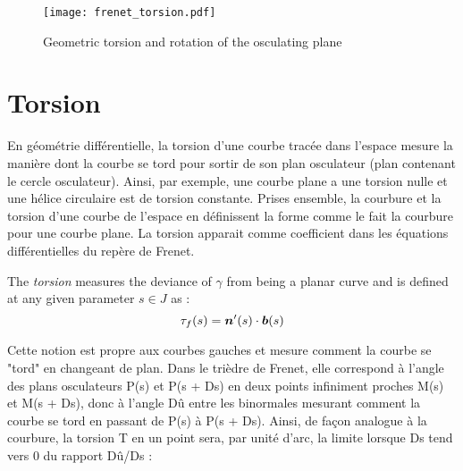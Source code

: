 
\begin{figure}[t]
\begin{center}
\texttt{[image: frenet\_torsion.pdf]}
\caption{Geometric torsion and rotation of the osculating plane}
\label{fig:3_1}
\end{center}
\end{figure}

\section{Torsion}
En géométrie différentielle, la torsion d'une courbe tracée dans l'espace mesure la manière dont la courbe se tord pour sortir de son plan osculateur (plan contenant le cercle osculateur). Ainsi, par exemple, une courbe plane a une torsion nulle et une hélice circulaire est de torsion constante. Prises ensemble, la courbure et la torsion d'une courbe de l'espace en définissent la forme comme le fait la courbure pour une courbe plane. La torsion apparait comme coefficient dans les équations différentielles du repère de Frenet.

The \emph{torsion} measures the deviance of $\gamma$ from being a planar curve and is defined at any given parameter $s \in J$ as :
\begin{equation}
\tau_f(s) = \boldsymbol{n}'(s) \cdot \boldsymbol{b}(s)
\end{equation}

Cette notion est propre aux courbes gauches et mesure comment la courbe se "tord" en changeant de plan. Dans le trièdre de Frenet, elle correspond à l'angle des plans osculateurs P(s) et P(s + Ds) en deux points infiniment proches M(s) et M(s + Ds), donc à l'angle Dû entre les binormales mesurant comment la courbe se tord en passant de P(s) à P(s + Ds). Ainsi, de façon analogue à la courbure, la torsion T en un point sera, par unité d'arc, la limite lorsque Ds tend vers 0 du rapport Dû/Ds :


